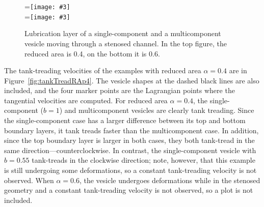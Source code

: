 \documentclass[twoside,twocolumn,9pt]{article}
\newcommand{\subfigimg}[3][,]{%
  \setbox1=\hbox{\texttt{[image: \#3]}}%
  \leavevmode\rlap{\usebox1}%
  \rlap{\hspace*{0pt}\raisebox{\dimexpr\ht1-0\baselineskip}{\bf
  \normalsize #2}}%
  \phantom{\usebox1}%
}
\begin{document}

\begin{figure}[h]
    \centering
    \subfigimg[width = \columnwidth]{(a)}{figures/Fig8a.pdf}\\
    \subfigimg[width = \columnwidth]{(b)}{figures/Fig8b.pdf}
    \caption{\small Lubrication layer of a single-component and a multicomponent vesicle moving through a stenosed channel. In the top figure, the reduced area is 0.4, on the bottom it is 0.6.}
    \label{fig:lubrication}
\end{figure}

The tank-treading velocities of the examples with reduced area $\alpha = 0.4$ are in Figure~\ref{fig:tankTreadRAp4}. The vesicle shapes at the dashed black lines are also included, and the four marker points are the Lagrangian points where the tangential velocities are computed. For reduced area $\alpha = 0.4$, the single-component ($b=1$) and multicomponent vesicles are clearly tank treading. Since the single-component case has a larger difference between its top and bottom boundary layers, it tank treads faster than the multicomponent case. In addition, since the top boundary layer is larger in both cases, they both tank-tread in the same direction---counterclockwise. In contrast, the single-component vesicle with $b=0.55$ tank-treads in the clockwise direction; note, however, that this example is still undergoing some deformations, so a constant tank-treading velocity is not observed. When $\alpha = 0.6$, the vesicle undergoes deformations while in the stenosed geometry and a constant tank-treading velocity is not observed, so a plot is not included. 
\end{document}
